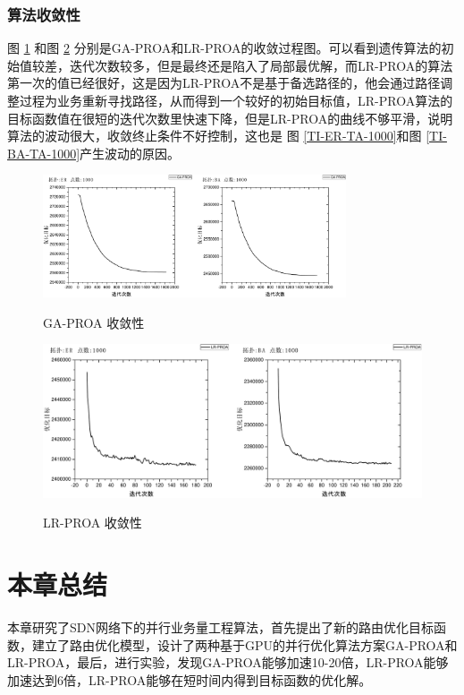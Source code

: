\subsubsection{算法收敛性}
图 \ref{CO-GA-1000} 和图 \ref{CO-LR-1000} 分别是GA-PROA和LR-PROA的收敛过程图。可以看到遗传算法的初始值较差，迭代次数较多，但是最终还是陷入了局部最优解，而LR-PROA的算法第一次的值已经很好，这是因为LR-PROA不是基于备选路径的，他会通过路径调整过程为业务重新寻找路径，从而得到一个较好的初始目标值，LR-PROA算法的目标函数值在很短的迭代次数里快速下降，但是LR-PROA的曲线不够平滑，说明算法的波动很大，收敛终止条件不好控制，这也是 图 \ref{TI-ER-TA-1000}和图 \ref{TI-BA-TA-1000}产生波动的原因。
\begin{figure}
\setlength{\belowcaptionskip}{-0.1cm}
\begin{center}
{\includegraphics[width=0.8\textwidth]{figures/CO-GA-1000.pdf}}
\end{center}
\caption{{\footnotesize{GA-PROA 收敛性}}}
\label{CO-GA-1000}
\end{figure}
\begin{figure}
\setlength{\belowcaptionskip}{-0.1cm}
\begin{center}
{\includegraphics[width=0.8 \textwidth]{figures/CO-LR-1000.pdf}}
\end{center}
\caption{{\footnotesize{LR-PROA 收敛性}}}
\label{CO-LR-1000}
\end{figure}
\section{本章总结}
本章研究了SDN网络下的并行业务量工程算法，首先提出了新的路由优化目标函数，建立了路由优化模型，设计了两种基于GPU的并行优化算法方案GA-PROA和LR-PROA，最后，进行实验，发现GA-PROA能够加速10-20倍，LR-PROA能够加速达到6倍，LR-PROA能够在短时间内得到目标函数的优化解。







